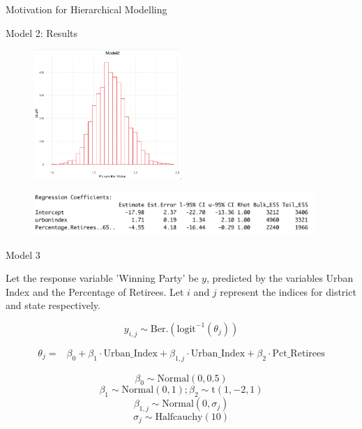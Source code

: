 \documentclass{beamer}
\begin{document}
\begin{frame}{Motivation for Hierarchical Modelling}
\begin{frame}{Model 2: Results}
    \begin{figure}
        \includegraphics[width=0.5\textwidth]{plots/model2_postui.png}
    \end{figure}
    \begin{figure}
        \includegraphics[width=0.95\textwidth]{plots/model2_coeff.png}
    \end{figure}
\end{frame}


\begin{frame}{Model 3}

    Let the response variable 'Winning Party' be \(y\), predicted by the variables Urban Index and the Percentage of Retirees. Let \(i\) and \(j\) represent the indices for district and state respectively.

    \[
    y_{i,j} \sim \text{Ber.}\left(\text{logit}^{-1}(\theta_{j})\right)
    \]

\[
\begin{aligned}
\theta_{j} =   &\beta_0 + \beta_1 \cdot \text{Urban\_Index} + \beta_{1,j} \cdot \text{Urban\_Index} + \beta_2 \cdot \text{Pct\_Retirees}
\end{aligned}
\]

    \[\beta_0 \sim \text{Normal}(0, 0.5)\]
    \[\beta_1 \sim \text{Normal}(0, 1); \beta_2 \sim \text{t}(1,-2,1)\]
    \[\beta_{1,j} \sim \text{Normal}(0, \sigma_j)\]
    \[ \sigma_j \sim \text{Halfcauchy}(10)\]

\end{frame}


\end{frame}
\end{document}
